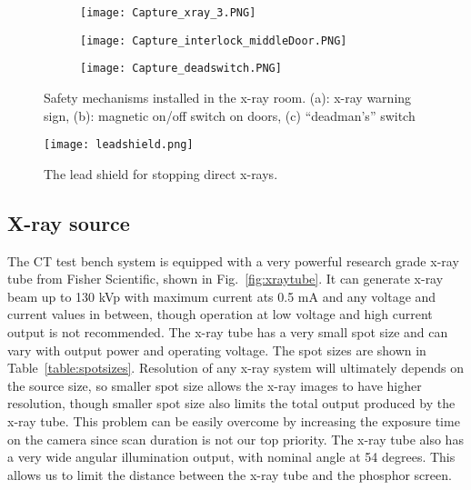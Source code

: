 \begin{figure}[h]
	\begin{subfigure}[b]{0.3\linewidth}
	\texttt{[image: Capture\_xray\_3.PNG]}
	\caption{}
	\label{fig:xraywarningsign}
	\end{subfigure}
\hspace{0.2cm}
	\begin{subfigure}[b]{0.3\linewidth}
	\texttt{[image: Capture\_interlock\_middleDoor.PNG]}
	\caption{}
	\label{fig:doorinterlock}
	\end{subfigure}	
\hspace{0.2cm}	
	\begin{subfigure}[b]{0.3\linewidth}
	\texttt{[image: Capture\_deadswitch.PNG]}
	\caption{}
	\label{fig:deadmanswitch}
	\end{subfigure}
\caption{Safety mechanisms installed in the x-ray room. (a): x-ray warning sign, (b): magnetic on/off switch on doors, (c) ``deadman's'' switch}
\label{fig:safetycomponents}
\end{figure}

\begin{figure}[h]
\centering
\texttt{[image: leadshield.png]}	
\caption{The lead shield for stopping direct x-rays.}
\label{fig:leadshield}
\end{figure}

\subsection{X-ray source}
The CT test bench system is equipped with a very powerful research grade x-ray tube from Fisher Scientific, shown in Fig.~\ref{fig:xraytube}.  It can generate x-ray beam up to 130 kVp with maximum current ats 0.5 mA and any voltage and current values in between, though operation at low voltage and high current output is not recommended.  The x-ray tube has a very small spot size and can vary with output power and operating voltage.  The spot sizes are shown in Table~\ref{table:spotsizes}.  Resolution of any x-ray system will ultimately depends on the source size, so smaller spot size allows the x-ray images to have higher resolution, though smaller spot size also limits the total output produced by the x-ray tube.  This problem can be easily overcome by increasing the exposure time on the camera since scan duration is not our top priority.  The x-ray tube also has a very wide angular illumination output, with nominal angle at 54 degrees.  This allows us to limit the distance between the x-ray tube and the phosphor screen.

